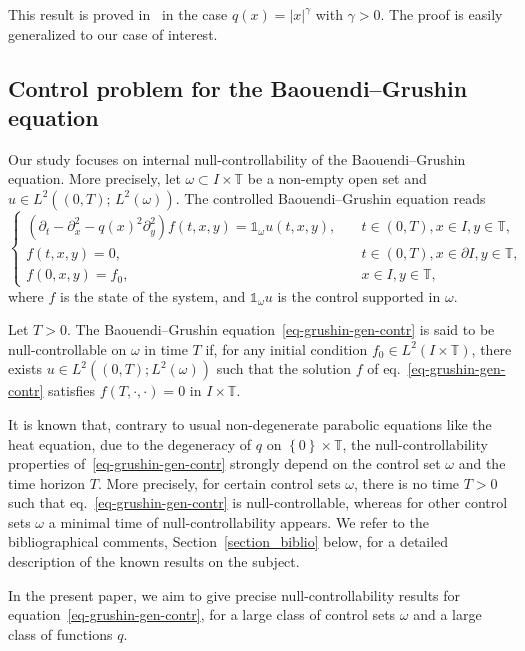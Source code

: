 \documentclass[AHL,Unicode,longabstracts,published]{cedram}
\newcommand{\1}{\mathds 1}
\newcommand{\T}{\mathbb{T}}
\renewcommand{\o}{\omega}
\renewcommand{\o}{\omega}
\begin{document}
This result is proved in~\cite{BCG14} in the case $q(x) = |x|^\gamma$ with $\gamma>0$. The proof is easily generalized to our case of interest.

\subsection{Control problem for the Baouendi--Grushin equation}

Our study focuses on internal null-controllability of the Baouendi--Grushin equation. More precisely, let $\omega \subset I \times \T$ be a non-empty open set and $u \in L^2((0,T); \, L^2(\o))$. The controlled Baouendi--Grushin equation reads
\begin{equation}\label{eq-grushin-gen-contr}
\left\{
\begin{array}{ll}
(\partial_t-\partial_x^2 - q(x)^2 \partial_y^2)f(t,x,y) = \mathds 1_\o u(t,x,y),&\quad t\in (0,T), x\in I, y\in \T,\\
f(t,x,y) = 0,&\quad t\in (0,T), x \in \partial I, y\in \T, \\
f(0,x,y) = f_0, & \quad x\in I, y\in \T,
\end{array}\right.
\end{equation}
where $f$ is the state of the system, and $\1_\o u$ is the control supported in $\o$.

\begin{defi} Let $T>0$. The Baouendi--Grushin equation~\eqref{eq-grushin-gen-contr} is said to be null-controllable on $\o$ in time $T$ if, for any initial condition
$f_0 \in L^2(I\times \T)$, there exists $u \in L^2((0,T);L^2(\o))$ such that the solution $f$ of eq.~\eqref{eq-grushin-gen-contr} satisfies $f(T,\cdot,\cdot) = 0$ in $I\times \T$.
\end{defi}

It is known that, contrary to usual non-degenerate parabolic equations like the heat equation, due to the degeneracy of $q$ on $\left\lbrace 0 \right\rbrace \times \T$, the null-controllability properties of~\eqref{eq-grushin-gen-contr} strongly depend on the control set $\o$ and the time horizon $T$. More precisely, for certain control sets $\o$, there is no time $T>0$ such that eq.~\eqref{eq-grushin-gen-contr} is null-controllable, whereas for other control sets $\o$ a minimal time of null-controllability appears. We refer to the bibliographical comments, Section~\ref{section_biblio} below, for a detailed description of the known results on the subject.

In the present paper, we aim to give precise null-controllability results for equation~\eqref{eq-grushin-gen-contr}, for a large class of control sets $\o$ and a large class of functions $q$.
\end{document}

